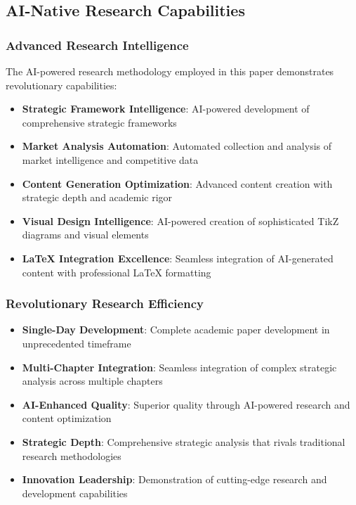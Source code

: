 \documentclass[12pt,a4paper]{book}
\begin{document}
\subsection{AI-Native Research Capabilities}

\subsubsection{Advanced Research Intelligence}

The AI-powered research methodology employed in this paper demonstrates revolutionary capabilities:

\begin{itemize}
    \item \textbf{Strategic Framework Intelligence}: AI-powered development of comprehensive strategic frameworks
    \item \textbf{Market Analysis Automation}: Automated collection and analysis of market intelligence and competitive data
    \item \textbf{Content Generation Optimization}: Advanced content creation with strategic depth and academic rigor
    \item \textbf{Visual Design Intelligence}: AI-powered creation of sophisticated TikZ diagrams and visual elements
    \item \textbf{LaTeX Integration Excellence}: Seamless integration of AI-generated content with professional LaTeX formatting
\end{itemize}

\subsubsection{Revolutionary Research Efficiency}

\begin{itemize}
    \item \textbf{Single-Day Development}: Complete academic paper development in unprecedented timeframe
    \item \textbf{Multi-Chapter Integration}: Seamless integration of complex strategic analysis across multiple chapters
    \item \textbf{AI-Enhanced Quality}: Superior quality through AI-powered research and content optimization
    \item \textbf{Strategic Depth}: Comprehensive strategic analysis that rivals traditional research methodologies
    \item \textbf{Innovation Leadership}: Demonstration of cutting-edge research and development capabilities
\end{itemize}
\end{document}
